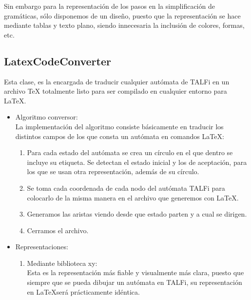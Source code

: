\documentclass[12pt,a4paper,spanish]{book}
\begin{document}
Sin embargo para la representaci\'on de los pasos en la simplificaci\'on de gram\'aticas, s\'olo disponemos de un dise\~no, puesto que la representaci\'on se hace mediante tablas y texto plano, siendo innecesaria la inclusi\'on de colores, formas, etc.
\newpage
\subsection{LatexCodeConverter}
Esta clase, es la encargada de traducir cualquier aut\'omata de TALFi en un archivo \TeX{} totalmente listo para ser compilado en cualquier entorno para \LaTeX{}.
\newline
\begin{itemize}
\item Algoritmo conversor:\\
\newline
La implementaci\'on del algoritmo consiste b\'asicamente en traducir los distintos campos de los que consta un aut\'omata en comandos \LaTeX{}:
\begin{enumerate}
\item Para cada estado del aut\'omata se crea un c\'irculo en el que dentro se incluye su etiqueta. Se detectan el estado inicial y los de aceptaci\'on, para los que se usan otra representaci\'on, adem\'as de su c\'irculo.
\item Se toma cada coordenada de cada nodo del aut\'omata TALFi para colocarlo de la misma manera en el archivo que generemos con \LaTeX{}.
\item Generamos las aristas viendo desde que estado parten y a cual se dirigen.
\item Cerramos el archivo.\\
\end{enumerate}
\newpage
\item Representaciones:\\
\begin{enumerate}
\item Mediante biblioteca xy:\\
\newline
Esta es la representaci\'on m\'as fiable y visualmente m\'as clara, puesto que siempre que se pueda dibujar un aut\'omata en TALFi, su representaci\'on en \LaTeX ser\'a pr\'acticamente id\'entica.\\
\begin{center}

\end{center}
\end{enumerate}
\end{itemize}
\end{document}

